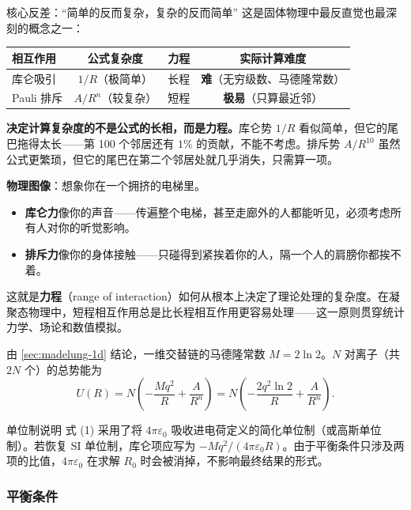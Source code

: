 \begin{insightbox}{核心反差：``简单的反而复杂，复杂的反而简单''}
这是固体物理中最反直觉也最深刻的概念之一：

\begin{center}
\renewcommand{\arraystretch}{1.5}
\begin{tabular}{|l|c|c|c|}
\hline
\textbf{相互作用} & \textbf{公式复杂度} & \textbf{力程} & \textbf{实际计算难度} \\
\hline
库仑吸引 & $1/R$（极简单） & 长程 & \textbf{难}（无穷级数、马德隆常数） \\
Pauli 排斥 & $A/R^n$（较复杂） & 短程 & \textbf{极易}（只算最近邻） \\
\hline
\end{tabular}
\end{center}

\textbf{决定计算复杂度的不是公式的长相，而是力程。}库仑势 $1/R$ 看似简单，但它的尾巴拖得太长——第 100 个邻居还有 $1\%$ 的贡献，不能不考虑。排斥势 $A/R^{10}$ 虽然公式更繁琐，但它的尾巴在第二个邻居处就几乎消失，只需算一项。

\textbf{物理图像}：想象你在一个拥挤的电梯里。
\begin{itemize}[nosep]
  \item \textbf{库仑力}像你的声音——传遍整个电梯，甚至走廊外的人都能听见，必须考虑所有人对你的听觉影响。
  \item \textbf{排斥力}像你的身体接触——只碰得到紧挨着你的人，隔一个人的肩膀你都挨不着。
\end{itemize}

这就是\textbf{力程}（range of interaction）如何从根本上决定了理论处理的复杂度。在凝聚态物理中，短程相互作用总是比长程相互作用更容易处理——这一原则贯穿统计力学、场论和数值模拟。
\end{insightbox}

由 \ref{sec:madelung-1d} 结论，一维交替链的马德隆常数 $M = 2\ln 2$。$N$ 对离子（共 $2N$ 个）的总势能为
\[
  U(R) = N\left(-\frac{Mq^2}{R} + \frac{A}{R^n}\right)
       = N\left(-\frac{2q^2\ln 2}{R} + \frac{A}{R^n}\right). \tag{1}
\]

\begin{tipbox}{单位制说明}
式 (1) 采用了将 $4\pi\varepsilon_0$ 吸收进电荷定义的简化单位制（或高斯单位制）。若恢复 SI 单位制，库仑项应写为 $-Mq^2/(4\pi\varepsilon_0 R)$。由于平衡条件只涉及两项的比值，$4\pi\varepsilon_0$ 在求解 $R_0$ 时会被消掉，不影响最终结果的形式。
\end{tipbox}

\subsubsection{平衡条件}

